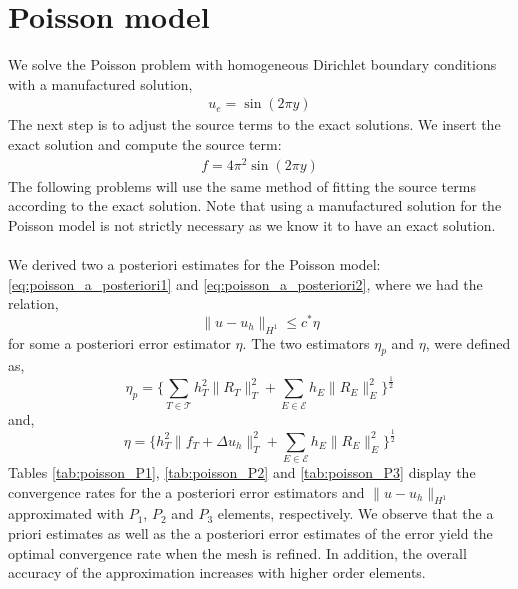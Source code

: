 \section{Poisson model} \label{section:num_exp_poisson} 
We solve the Poisson problem with homogeneous Dirichlet boundary conditions with a manufactured solution,
\begin{align} \label{test_poisson}
u_e = \sin(2\pi y)
\end{align}
The next step is to adjust the source terms to the exact solutions. We insert the exact solution and compute the source term:
\begin{align*}
f = 4\pi^2\sin(2\pi y)
\end{align*}
The following problems will use the same method of fitting the source terms according to the exact solution. Note that using a manufactured solution for the Poisson model is not strictly necessary as we know it to have an exact solution.
\\
\\
We derived two a posteriori estimates for the Poisson model: \eqref{eq:poisson_a_posteriori1} and \eqref{eq:poisson_a_posteriori2}, where we had the relation, 
\begin{equation}
\|u - u_h\|_{H^1} \leq c^* \eta
\end{equation}
for some a posteriori error estimator $\eta$. The two estimators $\eta_p$ and $\eta$, were defined as,  
\begin{equation}
\eta_p = \bigl\{ \sum_{T \in \mathcal{T}} h_T^2\| R_T\|^2_T + \displaystyle\sum_{E \in \mathcal{E}} h_E\| R_E \|^2_E \bigr\}^{\frac{1}{2}}
\end{equation}
and, 
\begin{equation}
\eta = \bigl\{ h_T^2 \|f_T + \Delta u_h\|_T^2  + \sum_{E \in \mathcal{E}} h_E \|R_E\|_E^2 \bigr\}^{\frac{1}{2}}
\end{equation}
Tables \ref{tab:poisson_P1}, \ref{tab:poisson_P2} and \ref{tab:poisson_P3} display the convergence rates for the a posteriori error estimators and $\|u-u_h \|_{H^1}$ approximated with $P_1$, $P_2$ and $P_3$ elements, respectively. We observe that the a priori estimates as well as the a posteriori error estimates of the error yield the optimal convergence rate when the mesh is refined. In addition, the overall accuracy of the approximation increases with higher order elements.  %
